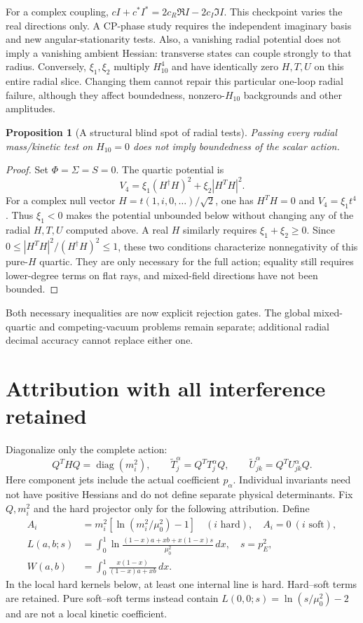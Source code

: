 \documentclass[11pt]{article}
\newcommand{\diag}{\operatorname{diag}}
\newtheorem{proposition}{Proposition}
\begin{document}
For a complex coupling, $cI+c^*I^*=2c_R\Re I-2c_I\Im I$.
This checkpoint varies the real directions only. A CP-phase study
requires the independent imaginary basis and new angular-stationarity
tests. Also, a vanishing radial potential does not imply a vanishing
ambient Hessian: transverse states can couple strongly to that radius.
Conversely, $\xi_1,\xi_2$ multiply $H_{10}^4$ and have identically zero
$H,T,U$ on this entire radial slice. Changing them cannot repair this
particular one-loop radial failure, although they affect boundedness,
nonzero-$H_{10}$ backgrounds and other amplitudes.

\begin{proposition}[A structural blind spot of radial tests]
Passing every radial mass/kinetic test on $H_{10}=0$ does not imply
boundedness of the scalar action.
\end{proposition}
\begin{proof}
Set $\Phi=\Sigma=S=0$. The quartic potential is
\begin{equation}
 V_4=\xi_1(H^\dagger H)^2+\xi_2|H^TH|^2.
\end{equation}
For a complex null vector $H=t(1,i,0,\ldots)/\sqrt2$, one has
$H^TH=0$ and $V_4=\xi_1t^4$. Thus $\xi_1<0$ makes the potential
unbounded below without changing any of the radial $H,T,U$ computed
above. A real $H$ similarly requires $\xi_1+\xi_2\ge0$. Since
$0\le |H^TH|^2/(H^\dagger H)^2\le1$, these two conditions characterize
nonnegativity of this pure-$H$ quartic. They are only necessary for the
full action; equality still requires lower-degree terms on flat rays,
and mixed-field directions have not been bounded.
\end{proof}
Both necessary inequalities are now explicit rejection gates. The
global mixed-quartic and competing-vacuum problems remain separate;
additional radial decimal accuracy cannot replace either one.

\section{Attribution with all interference retained}
Diagonalize only the complete action:
\begin{equation}
 Q^THQ=\diag(m_i^2),\qquad
 \widetilde T^\alpha_j=Q^TT^\alpha_jQ,\qquad
 \widetilde U^\alpha_{jk}=Q^TU^\alpha_{jk}Q.
\end{equation}
Here component jets include the actual coefficient $p_\alpha$.
Individual invariants need not have positive Hessians and do not define
separate physical determinants. Fix $Q,m_i^2$ and the hard projector
only for the following attribution. Define
\begin{align}
 A_i&=m_i^2[\ln(m_i^2/\mu_0^2)-1]\quad (i\text{ hard}),\quad A_i=0\ (i\text{ soft}),\\
 L(a,b;s)&=\int_0^1\ln\frac{(1-x)a+xb+x(1-x)s}{\mu_0^2}\,dx,\quad s=p_E^2,\\
 W(a,b)&=\int_0^1\frac{x(1-x)}{(1-x)a+xb}\,dx.
\end{align}
In the local hard kernels below, at least one internal line is hard.
Hard--soft terms are retained. Pure soft--soft terms instead contain
$L(0,0;s)=\ln(s/\mu_0^2)-2$ and are not a local kinetic coefficient.
\end{document}

